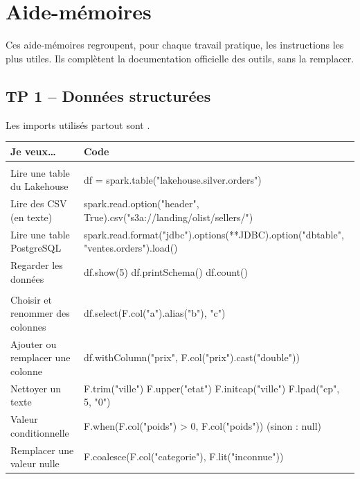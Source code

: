 \chapter{Aide-mémoires}\label{ann:aide}
Ces aide-mémoires regroupent, pour chaque travail pratique, les instructions les plus utiles.
Ils complètent la documentation officielle des outils, sans la remplacer.

\section{TP 1 -- Données structurées}\label{ann:aide-c3}

Les imports utilisés partout sont .

\begin{center}
\small
\renewcommand{\arraystretch}{1.22}
\begin{tabularx}{\textwidth}{@{}>{\raggedright\arraybackslash}p{4.1cm} >{\raggedright\arraybackslash\ttfamily\footnotesize}X@{}}
\toprule
\normalfont\textbf{Je veux\dots} & \normalfont\textbf{Code} \\
\midrule
\multicolumn{2}{@{}l}{\textbf{\textcolor{lhblue}{Lire}}} \\
Lire une table du Lakehouse & df = spark.table("lakehouse.silver.orders") \\
Lire des CSV (en texte) & spark.read.option("header", True).csv("s3a://landing/olist/sellers/") \\
Lire une table PostgreSQL & spark.read.format("jdbc").options(**JDBC).option("dbtable", "ventes.orders").load() \\
Regarder les données & df.show(5) \quad df.printSchema() \quad df.count() \\
\midrule
\multicolumn{2}{@{}l}{\textbf{\textcolor{lhblue}{Transformer}}} \\
Choisir et renommer des colonnes & df.select(F.col("a").alias("b"), "c") \\
Ajouter ou remplacer une colonne & df.withColumn("prix", F.col("prix").cast("double")) \\
Nettoyer un texte & F.trim("ville") \quad F.upper("etat") \quad F.initcap("ville") \quad F.lpad("cp", 5, "0") \\
Valeur conditionnelle & F.when(F.col("poids") > 0, F.col("poids")) \quad \textrm{(sinon : null)} \\
Remplacer une valeur nulle & F.coalesce(F.col("categorie"), F.lit("inconnue")) \\

\end{tabularx}
\end{center}

